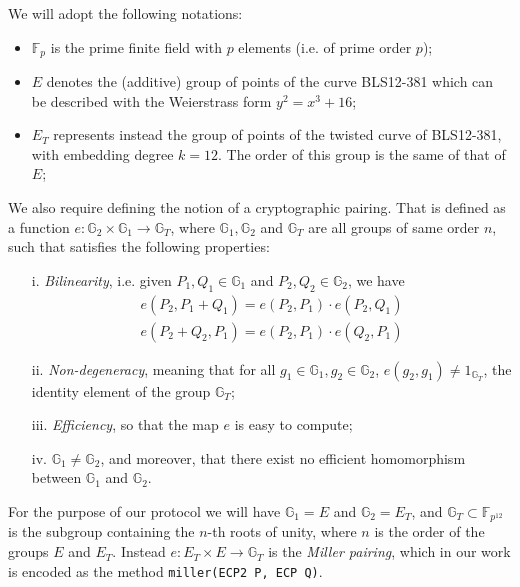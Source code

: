 We will adopt the following notations:
\begin{itemize}

\item $\mathbb{F}_p$ is the prime finite field with $p$ elements
  (i.e. of prime order $p$);

\item $E$ denotes the (additive) group of points of the curve
  BLS12-381 \cite{bls381-12} which can be described with the
  Weierstrass form $y^2=x^3 + 16$;

\item $E_T$ represents instead the group of points of the twisted
  curve of BLS12-381, with embedding degree $k=12$. The order of
  this group is the same of that of $E$;

\end{itemize}

We also require defining the notion of a cryptographic
pairing. That is defined as a function $e:
\mathbb{G}_2\times\mathbb{G}_1\to \mathbb{G}_T$, where
$\mathbb{G}_1,\mathbb{G}_2$ and $\mathbb{G}_T$ are all groups of same
order $n$, such that satisfies the following properties:

\begin{itemize}

\item [i.] \emph{Bilinearity}, i.e. given $P_1,Q_1\in\mathbb{G}_1$
  and $P_2,Q_2\in\mathbb{G}_2$, we have
  \begin{align*}
    e(P_2,P_1+Q_1) = e(P_2,P_1)\cdot e(P_2,Q_1)   \\
    e(P_2+Q_2,P_1) = e(P_2,P_1)\cdot e(Q_2,P_1)
  \end{align*}

\item[ii.] \emph{Non-degeneracy}, meaning that for all
  $g_1\in\mathbb{G}_1, g_2\in\mathbb{G}_2$, $e(g_2,g_1)\ne
  1_{\mathbb{G}_T}$, the identity element of the group
  $\mathbb{G}_T$;

\item[iii.] \emph{ Efficiency}, so that the map $e$ is easy to
  compute;

\item[iv. ] $\mathbb{G}_1\ne \mathbb{G}_2$, and moreover, that
  there exist no efficient homomorphism between $\mathbb{G}_1$ and
  $\mathbb{G}_2$.

\end{itemize}

For the purpose of our protocol we will have $\mathbb{G}_1 = E$ and
$\mathbb{G}_2 = E_T$, and $\mathbb{G}_T\subset \mathbb{F}_{p^{12}}$ is
the subgroup containing the $n$-th roots of unity, where $n$ is the
order of the groups $E$ and $E_T$. Instead $e: E_T \times E\to
\mathbb{G}_T$ is the \emph{Miller pairing}, which in our work is
encoded as the method \verb!miller(ECP2 P, ECP Q)!. \\


